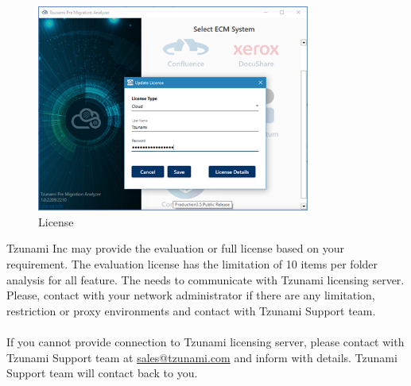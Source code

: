 \begin{figure} 
  \centering
	\includegraphics[width=0.8\textwidth]{Images/SelectEcmImage.png}
 \caption{\appName License}
\end{figure}
Tzunami Inc may provide the evaluation or full license based on your requirement. The evaluation license has the limitation of 10 items per folder analysis for all feature.
The \appName needs to communicate with Tzunami licensing server. Please, contact with your network administrator if there are any limitation, restriction or proxy environments and contact with Tzunami Support team. \\\\
If you cannot provide connection to Tzunami licensing server, please contact with Tzunami Support team at \href{mailto: sales@tzunami.com}{sales@tzunami.com} and inform with details. Tzunami Support team will contact back to you.
